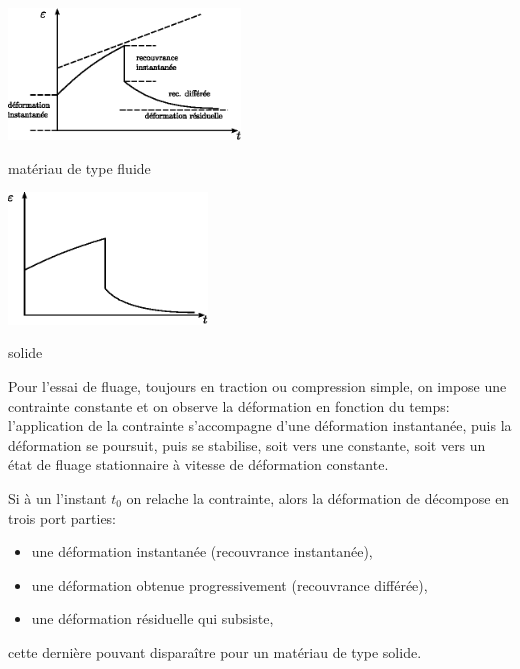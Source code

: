 \begin{multicols}{2}
    \begin{center}
        \includegraphics[height=3.5cm]{../images/T1_Ch04-0017}

        matériau de type fluide
    \end{center}
    \columnbreak
    \begin{center}
        \includegraphics[height=3.5cm]{../images/T1_Ch04-0018}

        solide
    \end{center}
\end{multicols}

Pour l'essai de fluage, toujours en traction ou compression simple, on impose une contrainte constante et on observe la déformation en fonction du temps: l'application de la contrainte s'accompagne d'une déformation instantanée, puis la déformation se poursuit, puis se stabilise, soit vers une constante, soit vers un état de fluage stationnaire à vitesse de déformation constante.

Si à un l'instant $t_0$ on relache la contrainte, alors la déformation de décompose en trois port parties:
\begin{itemize}
    \item une déformation instantanée (recouvrance instantanée),
    \item une déformation obtenue progressivement (recouvrance différée),
    \item une déformation résiduelle qui subsiste,
\end{itemize}
cette dernière pouvant disparaître pour un matériau de type solide.

